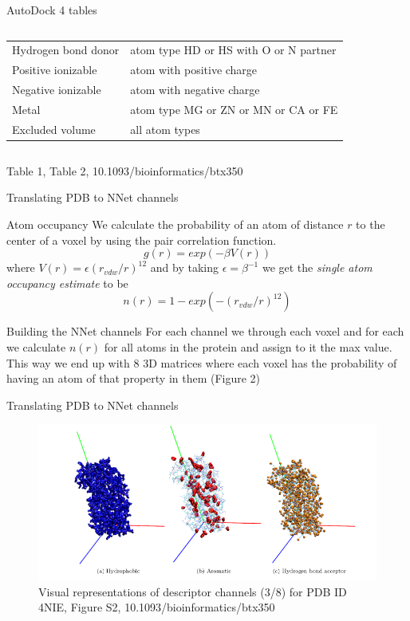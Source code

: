\documentclass{beamer}
\begin{document}
\begin{frame}{AutoDock 4 tables}
\begin{columns}
\begin{column}{.6\textwidth}
\begin{tiny}
\begin{table}
\begin{tabular}{ l l }
        Hydrogen bond donor & atom type HD or HS with O or N partner \\
        Positive ionizable & atom with positive charge \\
        Negative ionizable & atom with negative charge \\
        Metal & atom type MG or ZN or MN or CA or FE \\
        Excluded volume & all atom types \\
      \end{tabular}
      \end{table}
      \end{tiny}
    \end{column}
  \end{columns}
  Table 1, Table 2, 10.1093/bioinformatics/btx350
\end{frame}

\begin{frame}{Translating PDB to NNet channels}
  \begin{block}{Atom occupancy}
    We calculate the probability of an atom of distance $r$ to the center of a voxel by using the pair correlation function.
    \[
      g(r) = exp(-\beta V(r))
    \]
    where $V(r) = \epsilon (r_{vdw}/r)^{12}$ and by taking $\epsilon = \beta^{-1}$ we get the \emph{single atom occupancy estimate} to be
    \[
      n(r) = 1 - exp(-(r_{vdw}/r)^{12})
    \]
  \end{block}
  \begin{block}{Building the NNet channels}
    For each channel we through each voxel and for each we calculate $n(r)$ for all atoms in the protein and assign to it the max value. This way we end up with 8 3D matrices where each voxel has the probability of having an atom of that property in them (Figure 2)
  \end{block}
\end{frame}

\begin{frame}{Translating PDB to NNet channels}
  \begin{figure}[h]
    \includegraphics[width=1\textwidth]{deepsite_protein_property_channels}
    \caption{Visual representations of descriptor channels (3/8) for PDB ID 4NIE, Figure S2, 10.1093/bioinformatics/btx350}
  \end{figure}
\end{frame}
\end{document}
